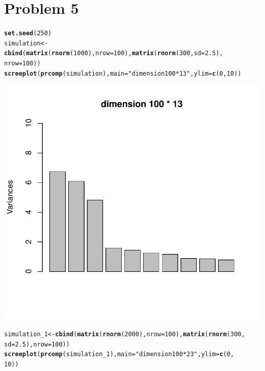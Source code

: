 \documentclass{article}\usepackage[]{graphicx}\usepackage[]{color}
\makeatletter
\def\maxwidth{ %
  \ifdim\Gin@nat@width>\linewidth
    \linewidth
  \else
    \Gin@nat@width
  \fi
}
\newcommand{\hlnum}[1]{\textcolor[rgb]{0.686,0.059,0.569}{#1}}%
\newcommand{\hlstr}[1]{\textcolor[rgb]{0.192,0.494,0.8}{#1}}%
\newcommand{\hlstd}[1]{\textcolor[rgb]{0.345,0.345,0.345}{#1}}%
\newcommand{\hlkwb}[1]{\textcolor[rgb]{0.69,0.353,0.396}{#1}}%
\newcommand{\hlkwc}[1]{\textcolor[rgb]{0.333,0.667,0.333}{#1}}%
\newcommand{\hlkwd}[1]{\textcolor[rgb]{0.737,0.353,0.396}{\textbf{#1}}}%
\newenvironment{kframe}{%
 \def\at@end@of@kframe{}%
 \ifinner\ifhmode%
  \def\at@end@of@kframe{\end{minipage}}%
  \begin{minipage}{\columnwidth}%
 \fi\fi%
 \def\FrameCommand##1{\hskip\@totalleftmargin \hskip-\fboxsep
 \colorbox{shadecolor}{##1}\hskip-\fboxsep
     \hskip-\linewidth \hskip-\@totalleftmargin \hskip\columnwidth}%
 \MakeFramed {\advance\hsize-\width
   \@totalleftmargin\z@ \linewidth\hsize
   \@setminipage}}%
 {\par\unskip\endMakeFramed%
 \at@end@of@kframe}
\newenvironment{knitrout}{}{} %
\makeatother
\begin{document}
\section*{Problem 5}
\begin{knitrout}
\color{fgcolor}\begin{kframe}
\begin{alltt}
\hlkwd{set.seed}\hlstd{(}\hlnum{250}\hlstd{)}
\hlstd{simulation} \hlkwb{<-} \hlkwd{cbind}\hlstd{(}\hlkwd{matrix}\hlstd{(}\hlkwd{rnorm}\hlstd{(}\hlnum{1000}\hlstd{),} \hlkwc{nrow} \hlstd{=} \hlnum{100}\hlstd{),} \hlkwd{matrix}\hlstd{(}\hlkwd{rnorm}\hlstd{(}\hlnum{300}\hlstd{,} \hlkwc{sd} \hlstd{=} \hlnum{2.5}\hlstd{),}
    \hlkwc{nrow} \hlstd{=} \hlnum{100}\hlstd{))}
\hlkwd{screeplot}\hlstd{(}\hlkwd{prcomp}\hlstd{(simulation),} \hlkwc{main} \hlstd{=} \hlstr{"dimension 100 * 13"}\hlstd{,} \hlkwc{ylim} \hlstd{=} \hlkwd{c}\hlstd{(}\hlnum{0}\hlstd{,} \hlnum{10}\hlstd{))}
\end{alltt}
\end{kframe}

{\centering \includegraphics[width=\maxwidth]{figure/minimal-Problem_51} 

}


\begin{kframe}\begin{alltt}
\hlstd{simulation_1} \hlkwb{<-} \hlkwd{cbind}\hlstd{(}\hlkwd{matrix}\hlstd{(}\hlkwd{rnorm}\hlstd{(}\hlnum{2000}\hlstd{),} \hlkwc{nrow} \hlstd{=} \hlnum{100}\hlstd{),} \hlkwd{matrix}\hlstd{(}\hlkwd{rnorm}\hlstd{(}\hlnum{300}\hlstd{,}
    \hlkwc{sd} \hlstd{=} \hlnum{2.5}\hlstd{),} \hlkwc{nrow} \hlstd{=} \hlnum{100}\hlstd{))}
\hlkwd{screeplot}\hlstd{(}\hlkwd{prcomp}\hlstd{(simulation_1),} \hlkwc{main} \hlstd{=} \hlstr{"dimension 100 * 23"}\hlstd{,} \hlkwc{ylim} \hlstd{=} \hlkwd{c}\hlstd{(}\hlnum{0}\hlstd{,}
    \hlnum{10}\hlstd{))}
\end{alltt}
\end{kframe}


\end{knitrout}
\end{document}
